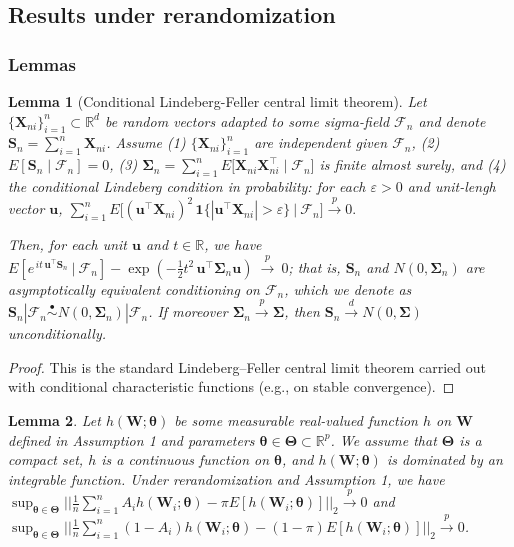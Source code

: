 \documentclass[12pt]{article}
\newtheorem{lemma}{Lemma}
\newcommand{\bX}{\boldsymbol{X}}
\newcommand{\bW}{\boldsymbol{W}}
\newcommand{\bS}{\boldsymbol{S}}
\newcommand{\bu}{\boldsymbol{u}}
\newcommand{\btheta}{\boldsymbol{\theta}}
\newcommand{\bTheta}{\boldsymbol{\Theta}}
\newcommand{\bSigma}{\mathbf{\Sigma}}
\begin{document}
\subsection{Results under rerandomization}
\subsubsection{Lemmas}

\begin{lemma}[Conditional Lindeberg-Feller central limit theorem]\label{lem:condCLT}
Let $\{\bX_{ni}\}_{i=1}^n\subset\mathbb R^d$ be random vectors adapted to some sigma-field $\mathcal F_n$ and denote $\bS_n=\sum_{i=1}^n \bX_{ni}$. Assume (1) $\{\bX_{ni}\}_{i=1}^n$ are independent given $\mathcal F_n$, (2) $E[\bS_n\mid \mathcal F_n]=0$, (3)  $\bSigma_n=\sum_{i=1}^n E\!\big[\bX_{ni}\bX_{ni}^\top\mid \mathcal F_n\big]$ is finite almost surely, and (4)  the conditional Lindeberg condition in probability:
for each $\varepsilon>0$ and unit-lengh vector $\bu$, $\sum_{i=1}^n E\!\Big[(\bu^\top \bX_{ni})^2\,\mathbf 1\{|\bu^\top \bX_{ni}|>\varepsilon\}\ \Big|\ \mathcal F_n\Big]\xrightarrow{p}0.$


Then, for each unit $\bu$ and $t\in\mathbb R$, we have $E\!\left[e^{\,it\,\bu^\top \bS_n}\ \big|\ \mathcal F_n\right]-\exp\!\left(-\frac12 t^2\,\bu^\top\bSigma_n \bu\right)\ \xrightarrow{p}\ 0$; that is, $\bS_n$ and $N(0,\bSigma_n)$ are asymptotically equivalent conditioning on $\mathcal{F}_n$, which we denote as $\bS_n | \mathcal{F}_n \overset{\bullet}{\sim} N(0,\bSigma_n) | \mathcal{F}_n$.  
If moreover $\bSigma_n \xrightarrow{p} \bSigma$, then $\bS_n \xrightarrow{d} N(0,\bSigma)$ unconditionally.
\end{lemma}

\begin{proof}
This is the standard Lindeberg--Feller central limit theorem carried out with conditional characteristic functions (e.g.,
\citealp{aldous1978mixing} on stable convergence).
\end{proof}

\begin{lemma}\label{lemma1}
    Let $h(\bW;\btheta)$ be some measurable real-valued function $h$ on $\bW$ defined in Assumption 1 and parameters $\btheta \in \bTheta \subset \mathbb{R}^p$. 
    We assume that $\bTheta$ is a compact set, $h$ is a continuous function on $\btheta$, and  $h(\bW;\btheta)$ is dominated by an integrable function. 
    Under rerandomization and Assumption 1, we have $\sup_{\btheta \in \bTheta}||\frac{1}{n} \sum_{i=1}^n A_i h(\bW_i;\btheta) - \pi E[h(\bW_i;\btheta)] ||_2 \xrightarrow{p} 0$ and $\sup_{\btheta \in \bTheta}||\frac{1}{n} \sum_{i=1}^n (1-A_i) h(\bW_i;\btheta) - (1-\pi) E[h(\bW_i;\btheta)] ||_2 \xrightarrow{p} 0$.
\end{lemma}
\end{document}
